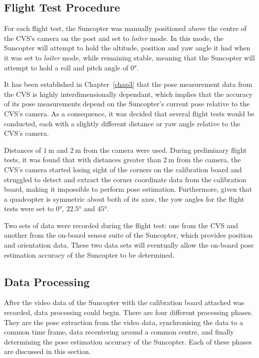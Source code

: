 \subsection{Flight Test Procedure}

For each flight test, the Suncopter was manually positioned above the centre of the CVS's camera on the post and set to \emph{loiter} mode. In this mode, the Suncopter will attempt to hold the altitude, position and yaw angle it had when it was set to \emph{loiter} mode, while remaining stable, meaning that the Suncopter will attempt to hold a roll and pitch angle of $\ang{0}$. 

It has been established in Chapter~\ref{chap3} that the pose measurement data from the CVS is highly interdimensionally dependant, which implies that the accuracy of its pose measurements depend on the Suncopter's current pose relative to the CVS's camera. As a consequence, it was decided that several flight tests would be conducted, each with a slightly different distance or yaw angle relative to the CVS's camera. 

Distances of $\SI{1}{\m}$ and $\SI{2}{\m}$ from the camera were used. During preliminary flight tests, it was found that with distances greater than $\SI{2}{\m}$ from the camera, the CVS's camera started losing sight of the corners on the calibration board and struggled to detect and extract the corner coordinate data from the calibration board, making it impossible to perform pose estimation. Furthermore, given that a quadcopter is symmetric about both of its axes, the yaw angles for the flight tests were set to $\ang{0}$, $\ang{22.5}$ and $\ang{45}$. 

Two sets of data were recorded during the flight test: one from the CVS and another from the on-board sensor suite of the Suncopter, which provides position and orientation data. These two data sets will eventually allow the on-board pose estimation accuracy of the Suncopter to be determined. 

\subsection{Data Processing}

After the video data of the Suncopter with the calibration board attached was recorded, data processing could begin. There are four different processing phases. They are the pose extraction from the video data, synchronising the data to a common time frame, data recentering around a common centre, and finally determining the pose estimation accuracy of the Suncopter. Each of these phases are discussed in this section. 

